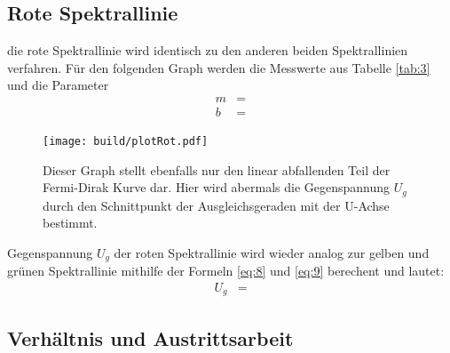 \newpage
\subsection{Rote Spektrallinie}

    \justifying die rote Spektrallinie wird identisch zu den anderen beiden Spektrallinien verfahren. Für den folgenden Graph werden die Messwerte aus Tabelle
    \ref{tab:3} und die Parameter
    \begin{align}
    m &= \text{} \label{eq:14}\\
    b &= \text{} \label{eq:15}
    \end{align}
    \justifying

    \begin{figure}[H]
        \centering
        \texttt{[image: build/plotRot.pdf]}
        \caption{Dieser Graph stellt ebenfalls nur den linear abfallenden Teil der Fermi-Dirak Kurve dar. Hier wird abermals die Gegenspannung $U_g$ durch den Schnittpunkt
        der Ausgleichsgeraden mit der U-Achse bestimmt.}
        \label{fig:9}
    \end{figure}

    \justifying Gegenspannung $U_g$ der roten Spektrallinie wird wieder analog zur gelben und grünen Spektrallinie mithilfe der Formeln \eqref{eq:8} und \eqref{eq:9} 
    berechent und lautet:
    \begin{align}
    U_g &=\text{} \label{eq:16}
    \end{align}

\subsection{Verhältnis und Austrittsarbeit}


